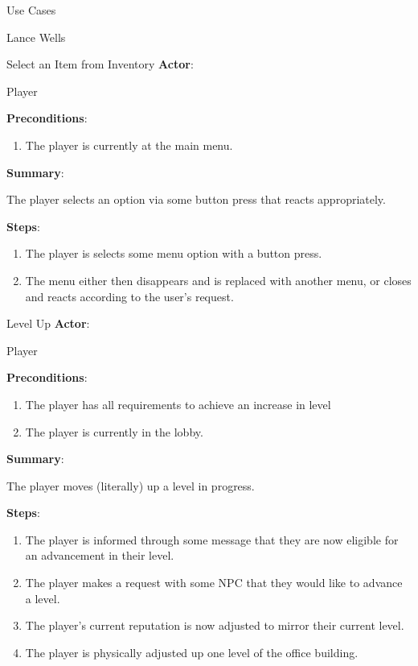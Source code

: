 \documentclass[12pt]{report}
\begin{document}
\begin{section}{Use Cases}
\begin{subsection}{Lance Wells}
\begin{subsubsection}{Select an Item from Inventory}
\textbf{Actor}:

Player

\textbf{Preconditions}:

\begin{enumerate}
\item The player is currently at the main menu.
\end{enumerate}

\textbf{Summary}:

The player selects an option via some button press that reacts
appropriately.

\textbf{Steps}:

\begin{enumerate}
\item The player is selects some menu option with a button press.
\item The menu either then disappears and is replaced with another menu, or
closes and reacts according to the user's request.
\end{enumerate}
\end{subsubsection}

\begin{subsubsection}{Level Up}
\textbf{Actor}:

Player

\textbf{Preconditions}:

\begin{enumerate}
\item The player has all requirements to achieve an increase in level
\item The player is currently in the lobby.
\end{enumerate}

\textbf{Summary}:

The player moves (literally) up a level in progress.

\textbf{Steps}:

\begin{enumerate}
\item The player is informed through some message that they are now eligible
for an advancement in their level.
\item The player makes a request with some NPC that they would like to
advance a level.
\item The player's current reputation is now adjusted to mirror their
current level.
\item The player is physically adjusted up one level of the office building.
\end{enumerate}
\end{subsubsection}


\end{subsection}
\end{section}
\end{document}
